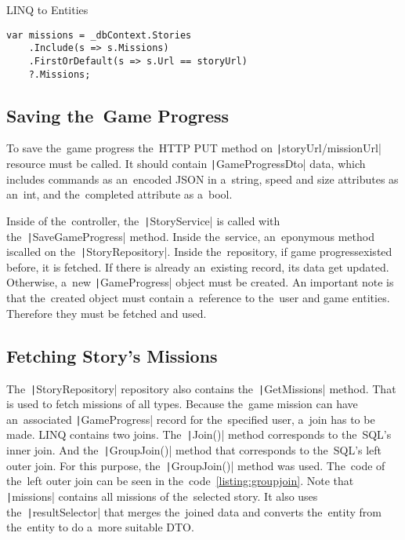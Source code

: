 \begin{listing}
    \caption{LINQ to Entities}
    \label{listing:linq}
    \begin{verbatim}
var missions = _dbContext.Stories
    .Include(s => s.Missions)
    .FirstOrDefault(s => s.Url == storyUrl)
    ?.Missions;
    \end{verbatim}
\end{listing}

\subsection{Saving the~Game Progress}

To save the~game progress the~HTTP PUT method on \linebreak\texttt|{storyUrl}/{missionUrl}| resource must be called.
It should contain \linebreak\texttt|GameProgressDto| data, which includes commands as an~encoded JSON in a~string, speed and size attributes as an~int, and the~completed attribute as a~bool.

Inside of the~controller, the~\texttt|StoryService| is called with the~\linebreak\texttt|SaveGameProgress| method.
Inside the~service, an~eponymous method is\linebreak{}called on the~\texttt|StoryRepository|.
Inside the~repository, if game progress\linebreak{}existed before, it is fetched.
If there is already an~existing record, its data get updated.
Otherwise, a~new \texttt|GameProgress| object must be created.
\linebreak
An important note is that the~created object must contain a~reference to the~user and game entities.
Therefore they must be fetched and used.

\subsection{Fetching Story's Missions}

The~\texttt|StoryRepository| repository also contains the~\texttt|GetMissions| method.
That is used to fetch missions of all types.
Because the~game mission can have an~associated \texttt|GameProgress| record for the~specified user, a~join has to be made.
LINQ contains two joins.
The~\texttt|Join()| method corresponds to the~SQL's inner join.
And the~\texttt|GroupJoin()| method that corresponds to the~SQL's left outer join.
For this purpose, the~\texttt|GroupJoin()| method was used.
The~code of the~left outer join can be seen in the~code~\ref{listing:groupjoin}.
Note that \texttt|missions| contains all missions of the~selected story.
It also uses the~\texttt|resultSelector| that merges the~joined data and converts the~entity from the~entity to do a~more suitable DTO.

